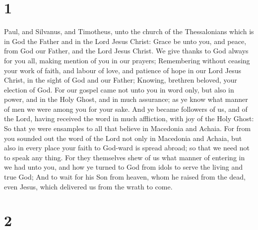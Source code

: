 \hypertarget{section}{%
\section{1}\label{section}}

 Paul, and Silvanus, and Timotheus, unto the church of the
Thessalonians which is in God the Father and in the Lord Jesus Christ:
Grace be unto you, and peace, from God our Father, and the Lord Jesus
Christ.  We give thanks to God always for you all, making
mention of you in our prayers;  Remembering without
ceasing your work of faith, and labour of love, and patience of hope in
our Lord Jesus Christ, in the sight of God and our Father;
 Knowing, brethren beloved, your election of God.
 For our gospel came not unto you in word only, but also
in power, and in the Holy Ghost, and in much assurance; as ye know what
manner of men we were among you for your sake.  And ye
became followers of us, and of the Lord, having received the word in
much affliction, with joy of the Holy Ghost:  So that ye
were ensamples to all that believe in Macedonia and Achaia.
 For from you sounded out the word of the Lord not only in
Macedonia and Achaia, but also in every place your faith to God-ward is
spread abroad; so that we need not to speak any thing. 
For they themselves shew of us what manner of entering in we had unto
you, and how ye turned to God from idols to serve the living and true
God;  And to wait for his Son from heaven, whom he raised
from the dead, even Jesus, which delivered us from the wrath to come.

\hypertarget{section-1}{%
\section{2}\label{section-1}}

